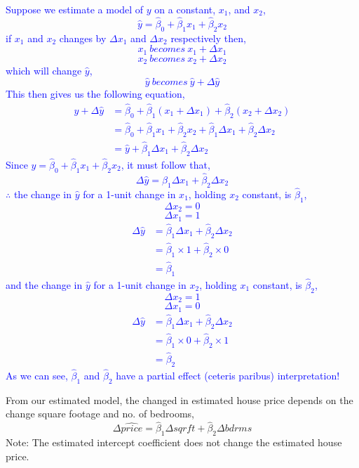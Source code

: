 \documentclass[12pt]{report}
\newenvironment{blueframed}[1][blue]
{\def\FrameCommand{\fboxsep=\FrameSep\fcolorbox{#1}{white}}%
\MakeFramed {\advance\hsize-\width \FrameRestore}}
{\endMakeFramed}
\begin{document}
\begin{blueframed}
	\noindent \textcolor{blue}
	{
		\noindent Suppose we estimate a model of $y$ on a constant, $x_1$, and $x_2$,
		$$\hat{y} = \hat{\beta}_0 + \hat{\beta}_1x_1 + \hat{\beta}_2x_2$$
		if $x_1$ and $x_2$ changes by ${\Delta}x_1$ and ${\Delta}x_2$ respectively then,
		$$x_1\ becomes\ x_1 +{\Delta}x_1$$
		$$x_2\ becomes\ x_2 +{\Delta}x_2$$
		which will change $\hat{y}$,  
		$$\hat{y}\ becomes\ \hat{y}+{\Delta}\hat{y}$$
		This then gives us the following equation,
		\begin{align*}
		\hat{y}+{\Delta}\hat{y} &= \hat{\beta}_0 + \hat{\beta}_1(x_1 + {\Delta}x_1) + \hat{\beta}_2(x_2+{\Delta}x_2) \\
		&= \hat{\beta}_0 + \hat{\beta}_1x_1 + \hat{\beta}_2x_2 + \hat{\beta}_1{\Delta}x_1 + \hat{\beta}_2{\Delta}x_2 \\
		&= \hat{y} + \hat{\beta}_1{\Delta}x_1 + \hat{\beta}_2{\Delta}x_2 
		\end{align*}
		Since $\hat{y} = \hat{\beta}_0 + \hat{\beta}_1x_1 + \hat{\beta}_2x_2$, it must follow that,
		$${\Delta}\hat{y} = \hat{\beta}_1{\Delta}x_1 + \hat{\beta}_2{\Delta}x_2$$
		$\therefore$  the change in $\hat{y}$ for a 1-unit change in $x_1$, holding $x_2$ constant, is $\hat{\beta}_1$,
		$${\Delta}x_2 = 0$$
		$${\Delta}x_1 = 1$$
		\begin{align*}
		{\Delta}\hat{y} &= \hat{\beta}_1{\Delta}x_1 + \hat{\beta}_2{\Delta}x_2 \\
		&= \hat{\beta}_1\times 1 + \hat{\beta}_2\times 0 \\
		&= \hat{\beta}_1
		\end{align*}
		and the change in $\hat{y}$ for a 1-unit change in $x_2$, holding $x_1$ constant, is $\hat{\beta}_2$,
		$${\Delta}x_2 = 1$$
		$${\Delta}x_1 = 0$$
		\begin{align*}
		{\Delta}\hat{y} &= \hat{\beta}_1{\Delta}x_1 + \hat{\beta}_2{\Delta}x_2 \\
		&= \hat{\beta}_1\times 0 + \hat{\beta}_2\times 1 \\
		&= \hat{\beta}_2
		\end{align*}
		As we can see, $\hat{\beta}_1$ and $\hat{\beta}_2$ have a partial effect (ceteris paribus) interpretation!
}\end{blueframed}

\noindent From our estimated model, the changed in estimated house price depends on the change square footage and no. of bedrooms,
$$\Delta\widehat{price} = \hat{\beta}_1\Delta sqrft + \hat{\beta}_2\Delta bdrms$$
\noindent Note: The estimated intercept coefficient does not change the estimated house price.
\end{document}
